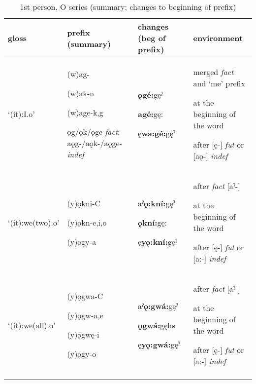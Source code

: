 \begin{table}
\caption{1st person, O series (summary; changes to beginning of prefix)}
\label{tab:1:1ppron}
\tiny{
\begin{tabularx}{\textwidth}{XXXX}
\lsptoprule
gloss & prefix (summary) & changes (beg of prefix) & environment\\
\midrule
‘(it):I.o’ & (w)ag-

(w)ak-n

(w)age-k,g

ǫg/ǫk/ǫge-\textit{fact}; aǫg-/aǫk-/aǫge-\textit{indef} & \textbf{ǫgé:}gęˀ

\textbf{agé:}gę:

ę\textbf{wa:gé:}gęˀ & merged \textit{fact} and ‘me’ prefix 

at the beginning of the word 

after [ę-] \textit{fut} or [aǫ-] \textit{indef}\\
‘(it):we(two).o’ & (y)ǫkni-C

(y)ǫkn-e,i,o

(y)ǫgy-a & aˀ\textbf{ǫ:kní:}gęˀ

\textbf{ǫkní:}gę:

ę\textbf{yǫ:kní:}gęˀ & after \textit{fact} [aˀ-] 

at the beginning of the word 

after [ę-] \textit{fut} or [a:-] \textit{indef}\\
‘(it):we(all).o' & (y)ǫgwa-C

(y)ǫgw-a,e

(y)ǫgwę-i

(y)ǫgy-o & aˀ\textbf{ǫ:gwá:}gęˀ

\textbf{ǫgwá:}gęhs

ę\textbf{yǫ:gwá:}gęˀ & after \textit{fact} [aˀ-] 

at the beginning of the word 

after [ę-] \textit{fut} or [a:-] \textit{indef}\\
\lspbottomrule
\end{tabularx}}
\end{table}

\lipsum[1-1]

